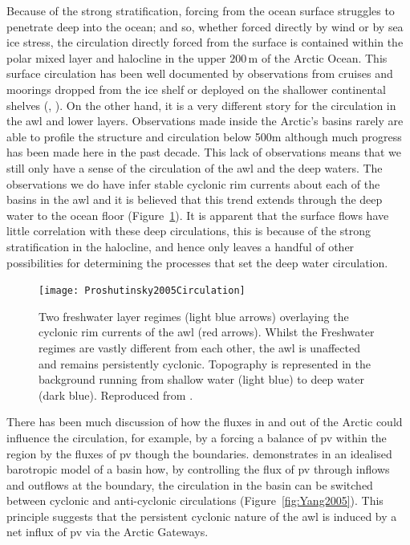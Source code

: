 \documentclass[12pt,a4paper]{report}
\newcommand*\figref[1]{Figure~\ref{#1}}
\begin{document}
Because of the strong stratification, forcing from the ocean surface 
struggles to penetrate deep into the ocean; and so, whether forced directly by wind 
or by sea ice stress, the circulation
directly forced from the surface is contained within the polar mixed layer 
and halocline in the upper $200\,\mathrm{m}$ of the Arctic Ocean. 
This surface circulation has been well documented by observations
from cruises and moorings  dropped  from  the  ice  shelf  or  deployed  on 
the  shallower  continental  shelves (\cite{gerdes1997large}, \cite{jones2001circulation}). On the other hand, it is a very different
story for the circulation in the \gls{awl} and lower layers. Observations made
inside the Arctic's basins rarely are able to profile the structure  and
circulation  below 500m  although much progress has been made here in the
past decade. This lack of observations means that  we  still only have  a  sense  of  the circulation 
of the \gls{awl} and the deep  waters.  The  observations  we  do 
have  infer stable cyclonic  rim  currents about each of the basins in the
\gls{awl} and it is believed that this trend extends through the deep water to the 
ocean floor (\figref{fig:Proshutinsky2005Circulation}).  It is apparent that the surface flows have little correlation with these deep circulations, this is because of the 
strong stratification in the halocline, and hence only leaves a handful of other possibilities for determining the processes that set the deep water circulation.


\begin{figure}
	\centering
	\texttt{[image: Proshutinsky2005Circulation]}
	\caption[\cite{proshutinsky2005arctic}]{ Two freshwater layer regimes (light 
		blue arrows) overlaying the cyclonic rim currents of the \gls{awl} (red arrows).
		Whilst the Freshwater regimes are vastly different from each other, the
		\gls{awl} is unaffected and remains persistently cyclonic.
		Topography is represented in the background running from 
		shallow water (light blue) to deep water (dark blue).  Reproduced from \cite{proshutinsky2005arctic}.}
	\label{fig:Proshutinsky2005Circulation}
\end{figure}

There has been much discussion
of how the fluxes in and out of the Arctic could influence the circulation,
for example, by a forcing a balance of \gls{pv} within the region by
the fluxes of \gls{pv} though the boundaries. \cite{yang2005arctic} demonstrates 
in an idealised barotropic model of a basin how, by controlling the flux 
of \gls{pv} through inflows and outflows
at the boundary, the circulation in the basin can be switched between cyclonic and
anti-cyclonic circulations (\figref{fig:Yang2005}). This principle suggests
that the persistent cyclonic nature of the \gls{awl} is induced by a 
net influx of \gls{pv} via the Arctic Gateways. 
\end{document}
